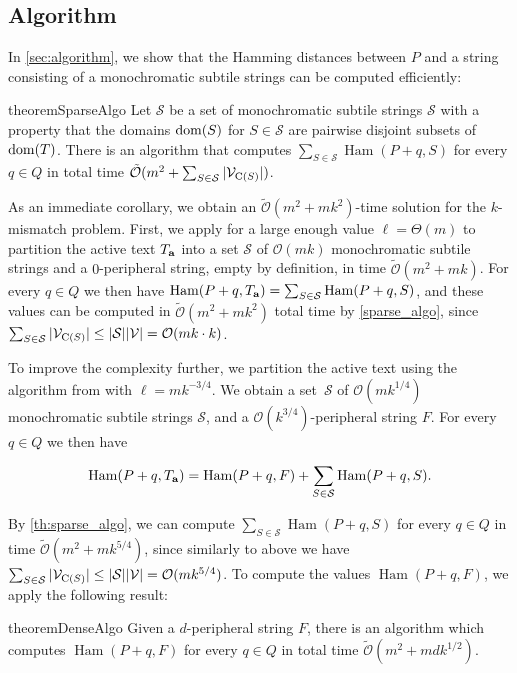 \documentclass[11pt, letterpaper]{article}
\theoremstyle{plain}
\theoremstyle{definition}
\theoremstyle{remark}
\renewcommand{\O}{\mathcal{O}}
\newcommand{\tO}{\tilde{\mathcal{O}}}
\renewcommand{\S}{\mathcal{S}}
\newcommand{\V}{\mathcal{V}}
\DeclareMathOperator*{\Ham}{Ham}
\begin{document}
\subsection{Algorithm}
In \cref{sec:algorithm}, we show that the Hamming distances between $P$ and a string consisting of a monochromatic subtile strings can be computed efficiently: 

\begin{restatable}{theorem}{SparseAlgo}
\label{th:sparse_algo}
Let $\S$ be a set of monochromatic subtile strings $\S$ with a property that the domains $\operatorname*{dom}(S)$ for $S \in \S$ are pairwise disjoint subsets of $\operatorname*{dom}(T)$. There is an algorithm that computes
$\sum_{S \in \S} \Ham(P + q, S)$ for every $q \in Q$ in total time $\tO(m^2 + \sum_{S \in \S} |\V_{\getchar{S}}|)$.
\end{restatable}

As an immediate corollary, we obtain an $\tO(m^2 + mk^2)$-time solution for the $k$-mismatch problem. First, we apply  for a large enough value $\ell = \Theta(m)$ to partition the active text $T_\mathbf{a}$ into a set $\S$ of $\O(mk)$ monochromatic subtile strings and a $0$-peripheral string, empty by definition, in time $\tO(m^2 + mk)$. For every $q \in Q$ we then have $\Ham(P + q, \Ta) = \sum_{S \in \S} \Ham(P + q, S)$, and these values can be computed in $\tO(m^2 + mk^{2})$ total time by \cref{sparse_algo}, since $\sum_{S \in \S} |\V_{\getchar{S}}| \le |\S| |\V| = \O(mk \cdot k)$. 

To improve the complexity further, we partition the active text using the algorithm from  with $\ell = mk^{-3/4}$.
We obtain a set~$\S$ of $\O(mk^{1/4})$ monochromatic subtile strings $\S$, and a $\O(k^{3 / 4})$-peripheral string $F$. For every $q \in Q$ we then have

\[ \Ham(P + q, \Ta) = \Ham(P + q, F) + \sum_{S \in \S} \Ham(P + q, S).\]

By \cref{th:sparse_algo}, we can compute $\sum_{S \in \S} \Ham(P + q, S)$ for every $q \in Q$ in time $\tO(m^2 + mk^{5/4})$, since similarly to above we have $\sum_{S \in \S} |\V_{\getchar{S}}| \le |\S| |\V| = \O(mk^{5/4})$. To compute the values $\Ham(P + q, F)$, we apply the following result:

\begin{restatable*}{theorem}{DenseAlgo}
\label{th:dense_algo}
Given a $d$-peripheral string $F$, there is an algorithm which computes $\Ham(P + q, F)$ for every $q \in Q$ in total time $\tO(m^2 + mdk^{1/2})$.
\end{restatable*}
\end{document}
